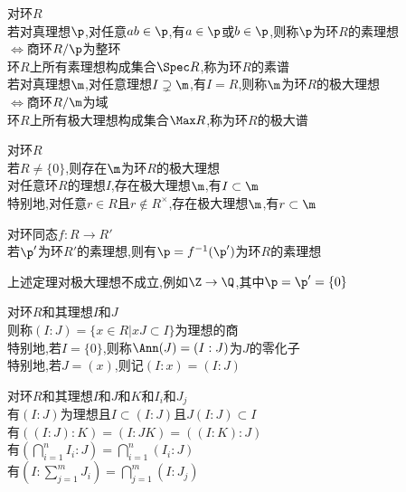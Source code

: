 \begin{dingyi}
对环$R$\\
若对真理想$\p$,对任意$ab\in \p$,有$a\in \p$或$b\in \p$,则称$\p$为环$R$的素理想\\
$\Leftrightarrow$商环$R/\p$为整环\\
环$R$上所有素理想构成集合$\Spec R$,称为环$R$的素谱\\
若对真理想$\m$,对任意理想$I\supsetneq \m$,有$I=R$,则称$\m$为环$R$的极大理想\\
$\Leftrightarrow$商环$R/\m$为域\\
环$R$上所有极大理想构成集合$\Max R$,称为环$R$的极大谱
\end{dingyi}

\begin{dingli}
对环$R$\\
若$R\neq\{0\}$,则存在$\m$为环$R$的极大理想\\
对任意环$R$的理想$I$,存在极大理想$\m$,有$I\subset \m$\\
特别地,对任意$r\in R$且$r\notin R^{\times}$,存在极大理想$\m$,有$r\subset \m$
\end{dingli}

\begin{dingli}
对环同态$f:R\to R'$\\
若$\p'$为环$R'$的素理想,则有$\p=f^{-1}(\p')$为环$R$的素理想
\end{dingli}

\begin{zhu}
上述定理对极大理想不成立,例如$\Z\to \Q$,其中$\p=\p'=\{0\}$
\end{zhu}

\begin{dingyi}
对环$R$和其理想$I$和$J$\\
则称$(I:J)=\{x\in R|xJ\subset I\}$为理想的商\\
特别地,若$I=\{0\}$,则称$\Ann(J)=(I:J)$为$J$的零化子\\
特别地,若$J=(x)$,则记$(I:x)=(I:J)$
\end{dingyi}

\begin{dingli}
对环$R$和其理想$I$和$J$和$K$和$I_i$和$J_j$\\
有$(I:J)$为理想且$I\subset (I:J)$且$J(I:J)\subset I$\\
有$((I:J):K)=(I:JK)=((I:K):J)$\\
有$(\bigcap\limits_{i=1}^{n}I_i:J)=\bigcap\limits_{i=1}^{n}(I_i:J)$\\
有$(I:\sum\limits_{j=1}^{m}J_i)=\bigcap\limits_{j=1}^{m}(I:J_j)$
\end{dingli}

